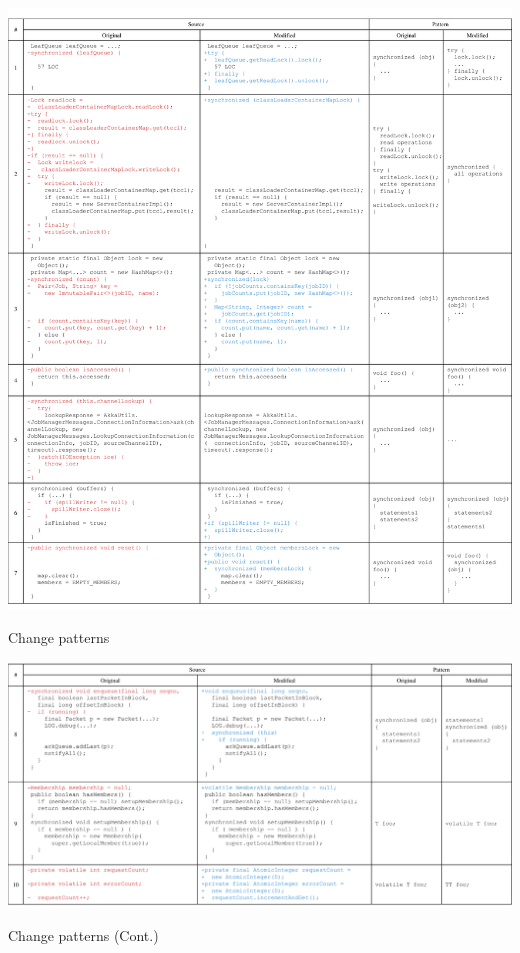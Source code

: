 \begin{table}
	\centering
	\includegraphics[width=1\textwidth]{patterns}
	\caption{Change patterns}
	\label{table:patterns}

\end{table}
\begin{table}
	\centering
	\includegraphics[width=1\textwidth]{patterns2}
	\caption{Change patterns (Cont.)}
	\label{table:patterns2}\vspace*{-3ex}
\end{table}
